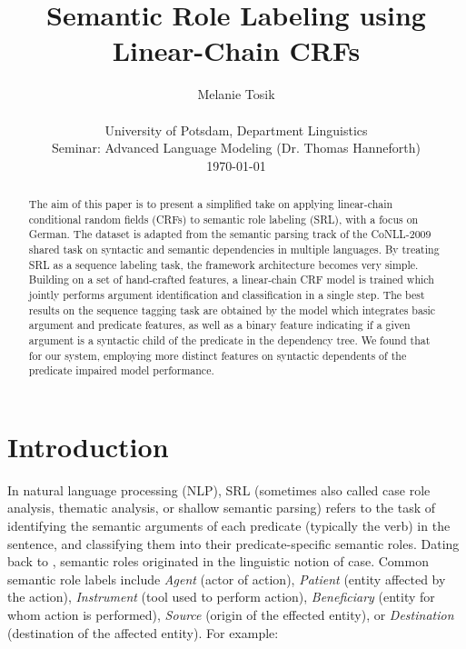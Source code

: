 \documentclass[a4paper,twoside,12pt]{article}
\begin{document}
\title{Semantic Role Labeling using Linear-Chain CRFs}
\author{Melanie Tosik\\\\
\small University of Potsdam, Department Linguistics\\
\small Seminar: Advanced Language Modeling (Dr. Thomas Hanneforth)\\
\small \today}
\date{}
\maketitle

\pagestyle{myheadings}
\thispagestyle{empty}

\begin{abstract}
\noindent
The aim of this paper is to present a simplified take on applying linear-chain conditional random fields (CRFs) to semantic role labeling (SRL), with a focus on German. The dataset is adapted from the semantic parsing track of the CoNLL-2009 shared task on syntactic and semantic dependencies in multiple languages. By treating SRL as a sequence labeling task, the framework architecture becomes very simple. Building on a set of hand-crafted features, a linear-chain CRF model is trained which jointly performs argument identification and classification in a single step. The best results on the sequence tagging task are obtained by the model which integrates basic argument and predicate features, as well as a binary feature indicating if a given argument is a syntactic child of the predicate in the dependency tree. We found that for our system, employing more distinct features on syntactic dependents of the predicate impaired model performance.

\end{abstract}

\section{Introduction}
\label{sec:intro}

In natural language processing (NLP), SRL (sometimes also called case role analysis, thematic analysis, or shallow semantic parsing) refers to the task of identifying the semantic arguments of each predicate (typically the verb) in the sentence, and classifying them into their predicate-specific semantic roles. Dating back to \cite{fillmore}, semantic roles originated in the linguistic notion of case. Common semantic role labels include \textit{Agent} (actor of action), \textit{Patient} (entity affected by the action), \textit{Instrument} (tool used to perform action), \textit{Beneficiary} (entity for whom action is performed), \textit{Source} (origin of the effected entity), or \textit{Destination} (destination of the affected entity). For example:
\end{document}
